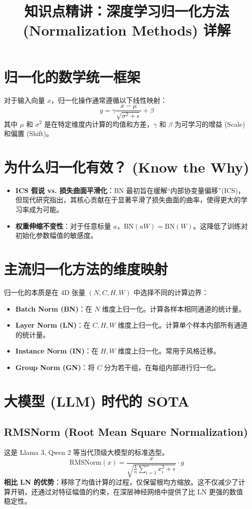 \documentclass[12pt, a4paper]{article}
\title{知识点精讲：深度学习归一化方法 (Normalization Methods) 详解}
\author{}
\date{}
\begin{document}
\maketitle

\section{归一化的数学统一框架}
对于输入向量 $x$，归一化操作通常遵循以下线性映射：
$$ y = \gamma \frac{x - \mu}{\sqrt{\sigma^2 + \epsilon}} + \beta $$
其中 $\mu$ 和 $\sigma^2$ 是在特定维度内计算的均值和方差，$\gamma$ 和 $\beta$ 为可学习的增益 (Scale) 和偏置 (Shift)。

\section{为什么归一化有效？ (Know the Why)}
\begin{itemize}
    \item \textbf{ICS 假说 vs. 损失曲面平滑化}：BN 最初旨在缓解“内部协变量偏移”(ICS)，但现代研究指出，其核心贡献在于显著平滑了损失曲面的曲率，使得更大的学习率成为可能。
    \item \textbf{权重伸缩不变性}：对于任意标量 $a$，$\text{BN}(aW) = \text{BN}(W)$。这降低了训练对初始化参数幅值的敏感度。
\end{itemize}

\section{主流归一化方法的维度映射}
归一化的本质是在 4D 张量 $(N, C, H, W)$ 中选择不同的计算边界：
\begin{itemize}
    \item \textbf{Batch Norm (BN)}：在 $N$ 维度上归一化。计算各样本相同通道的统计量。
    \item \textbf{Layer Norm (LN)}：在 $C, H, W$ 维度上归一化。计算单个样本内部所有通道的统计量。
    \item \textbf{Instance Norm (IN)}：在 $H, W$ 维度上归一化。常用于风格迁移。
    \item \textbf{Group Norm (GN)}：将 $C$ 分为若干组，在每组内部进行归一化。
\end{itemize}

\section{大模型 (LLM) 时代的 SOTA}

\subsection{RMSNorm (Root Mean Square Normalization)}
这是 Llama 3, Qwen 2 等当代顶级大模型的标准选型。
$$ \text{RMSNorm}(x) = \frac{x}{\sqrt{\frac{1}{n}\sum_{i=1}^n x_i^2 + \epsilon}} \cdot g $$
\textbf{相比 LN 的优势}：移除了均值计算的过程，仅保留根均方缩放。这不仅减少了计算开销，还通过对特征幅值的约束，在深层神经网络中提供了比 LN 更强的数值稳定性。
\end{document}
